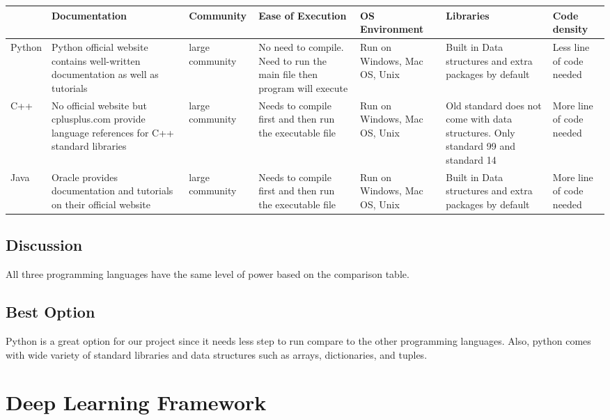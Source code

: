\begin{tabular}{|l|l|l|l|l|l|l|}
  \hline
   & Documentation & Community  & Ease of Execution & OS Environment & Libraries & Code density \\ \hline
 \parbox{1cm}{Python} & \parbox{2cm}{Python official website contains well-written documentation as well as tutorials}  & \parbox{2cm}{large community}  & \parbox{2cm}{No need to compile. Need to run the main file then program will execute}  & \parbox{2cm}{Run on Windows, Mac OS, Unix } & \parbox{2cm}{Built in Data structures and extra packages by default} & \parbox{2cm}{Less line of code needed }  \\ \hline
 \parbox{1cm}{C++} & \parbox{2cm}{No official website but cplusplus.com provide language references for C++ standard libraries}  &  \parbox{2cm}{large community} &  \parbox{2cm}{Needs to compile first and then run the executable file} &  \parbox{2cm}{Run on Windows, Mac OS, Unix} & \parbox{2cm}{Old standard does not come with data structures. Only standard 99 and standard 14} &  \parbox{2cm}{More line of code needed} \\ \hline
 \parbox{1cm}{Java} &  \parbox{2cm}{Oracle provides documentation and tutorials on their official website}  &   \parbox{2cm}{large community} &  \parbox{2cm}{Needs to compile first and then run the executable file} &  \parbox{2cm}{Run on Windows, Mac OS, Unix} &  \parbox{2cm}{Built in Data structures and extra packages by default} &  \parbox{2cm}{More line of code needed} \\ \hline
\end{tabular}


\subsection{Discussion}
All three programming languages have the same level of power based on the comparison table.

\subsection{Best Option}
Python is a great option for our project since it needs less step to run compare to the other
programming languages. Also, python comes with wide variety of standard libraries and data structures such as
arrays, dictionaries, and tuples.


\section{Deep Learning Framework}

